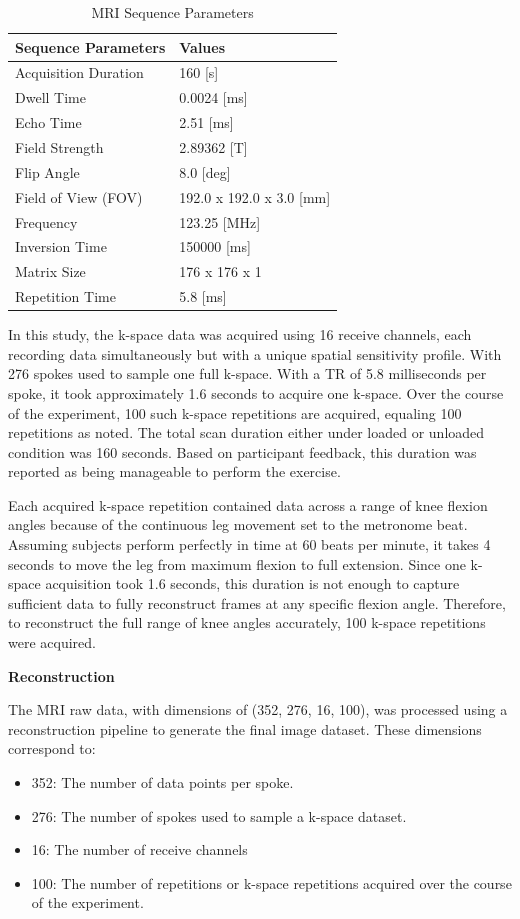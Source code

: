 \documentclass{micro-econ-thesis}
\begin{document}
\begin{table}[H]
	\centering
	
	\caption{MRI Sequence Parameters}
	\label{tab:mri_seq_params}
	\begin{tabular}{@{}ll@{}}
		\toprule
		Sequence Parameters & Values \\ \midrule
		Acquisition Duration & 160 [s] \\
		Dwell Time & 0.0024 [ms] \\
		Echo Time & 2.51 [ms] \\
		Field Strength & 2.89362 [T] \\
		Flip Angle & 8.0 [deg] \\
		Field of View (FOV) & 192.0 x 192.0 x 3.0 [mm] \\
		Frequency & 123.25 [MHz] \\
		Inversion Time & 150000 [ms] \\
		Matrix Size & 176 x 176 x 1 \\
		Repetition Time & 5.8 [ms] \\
		\bottomrule
	\end{tabular}
\end{table}

In this study, the k-space data was acquired using 16 receive channels, each recording data simultaneously but with a unique spatial sensitivity profile. With 276 spokes used to sample one full k-space. With a TR of 5.8 milliseconds per spoke, it took approximately 1.6 seconds to acquire one k-space. Over the course of the experiment, 100 such k-space repetitions are acquired, equaling 100 repetitions as noted. The total scan duration either under loaded or unloaded condition was 160 seconds. Based on participant feedback, this duration was reported as being manageable to perform the exercise. 

Each acquired k-space repetition contained data across a range of knee flexion angles because of the continuous leg movement set to the metronome beat. Assuming subjects perform perfectly in time at 60 beats per minute, it takes 4 seconds to move the leg from maximum flexion to full extension. Since one k-space acquisition took 1.6 seconds, this duration is not enough to capture sufficient data to fully reconstruct frames at any specific flexion angle. Therefore, to reconstruct the full range of knee angles accurately,  100 k-space repetitions were acquired. 
    
\textbf{Reconstruction}

The MRI raw data, with dimensions of (352, 276, 16, 100), was processed using a reconstruction pipeline to generate the final image dataset. These dimensions correspond to: 
\begin{itemize}
	\item 352: The number of data points per spoke.
	\item 276: The number of spokes used to sample a k-space dataset.
	\item 16: The number of receive channels
	\item 100: The number of repetitions or k-space repetitions acquired over the course of the experiment.
\end{itemize}
\end{document}
